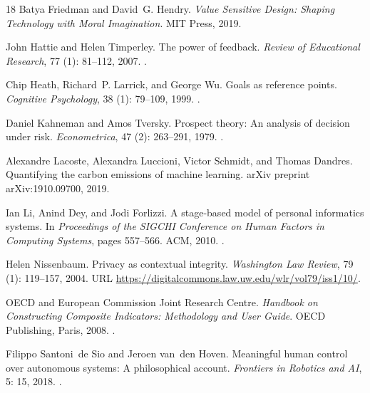 \documentclass[11pt,a4paper]{article}
\begin{document}
\begin{thebibliography}{18}
Batya Friedman and David~G. Hendry.
\newblock \emph{Value Sensitive Design: Shaping Technology with Moral
  Imagination}.
\newblock MIT Press, 2019.

John Hattie and Helen Timperley.
\newblock The power of feedback.
\newblock \emph{Review of Educational Research}, 77 (1):
  81--112, 2007.
\newblock {}.

Chip Heath, Richard~P. Larrick, and George Wu.
\newblock Goals as reference points.
\newblock \emph{Cognitive Psychology}, 38 (1): 79--109, 1999.
\newblock {}.

Daniel Kahneman and Amos Tversky.
\newblock Prospect theory: An analysis of decision under risk.
\newblock \emph{Econometrica}, 47 (2): 263--291, 1979.
\newblock {}.

Alexandre Lacoste, Alexandra Luccioni, Victor Schmidt, and Thomas Dandres.
\newblock Quantifying the carbon emissions of machine learning.
\newblock arXiv preprint arXiv:1910.09700, 2019.

Ian Li, Anind Dey, and Jodi Forlizzi.
\newblock A stage-based model of personal informatics systems.
\newblock In \emph{Proceedings of the SIGCHI Conference on Human Factors in
  Computing Systems}, pages 557--566. ACM, 2010.
\newblock {}.

Helen Nissenbaum.
\newblock Privacy as contextual integrity.
\newblock \emph{Washington Law Review}, 79 (1): 119--157,
  2004.
\newblock URL \url{https://digitalcommons.law.uw.edu/wlr/vol79/iss1/10/}.

{OECD} and {European Commission Joint Research Centre}.
\newblock \emph{Handbook on Constructing Composite Indicators: Methodology and
  User Guide}.
\newblock OECD Publishing, Paris, 2008.
\newblock {}.

Filippo Santoni~de Sio and Jeroen van~den Hoven.
\newblock Meaningful human control over autonomous systems: A philosophical
  account.
\newblock \emph{Frontiers in Robotics and AI}, 5: 15, 2018.
\newblock {}.


\end{thebibliography}
\end{document}

